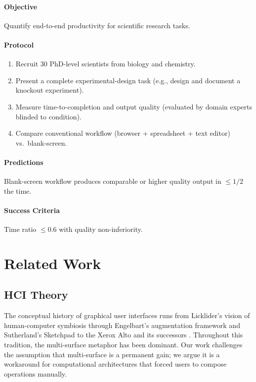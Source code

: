 \documentclass[11pt,a4paper]{article}
\theoremstyle{definition}
\theoremstyle{remark}
\begin{document}
\paragraph{Objective} Quantify end-to-end productivity for scientific research tasks.

\paragraph{Protocol}
\begin{enumerate}
    \item Recruit 30 PhD-level scientists from biology and chemistry.
    \item Present a complete experimental-design task (e.g., design and document a knockout experiment).
    \item Measure time-to-completion and output quality (evaluated by domain experts blinded to condition).
    \item Compare conventional workflow (browser + spreadsheet + text editor) vs.\ blank-screen.
\end{enumerate}

\paragraph{Predictions}
Blank-screen workflow produces comparable or higher quality output in $\leq 1/2$ the time.

\paragraph{Success Criteria}
Time ratio $\leq 0.6$ with quality non-inferiority.

\section{Related Work}
\label{sec:related}

\subsection{HCI Theory}

The conceptual history of graphical user interfaces runs from Licklider's vision of human-computer symbiosis \citep{licklider1960symbiosis} through Engelbart's augmentation framework \citep{engelbart1962augmenting} and Sutherland's Sketchpad \citep{sutherland1963sketchpad} to the Xerox Alto and its successors \citep{kay1977personal, smith1982star}. Throughout this tradition, the multi-surface metaphor has been dominant. Our work challenges the assumption that multi-surface is a permanent gain; we argue it is a workaround for computational architectures that forced users to compose operations manually.
\end{document}
